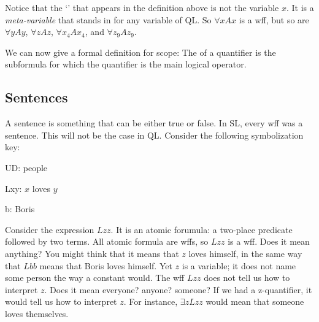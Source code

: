 Notice that the `' that appears in the definition above is not the variable $x$. It is a \emph{meta-variable} that stands in for any variable of QL. So $\forall xAx$ is a wff, but so are $\forall yAy$, $\forall zAz$, $\forall x_4Ax_4$, and $\forall z_9Az_9$.

We can now give a formal definition for scope: The  of a quantifier is the subformula for which the quantifier is the main logical operator. 








\subsection{Sentences}

A {sentence} is something that can be either true or false. In SL, every wff was a sentence. This will not be the case in QL. Consider the following symbolization key:
\begin{ekey}
\item[UD:] people
\item[Lxy:] $x$ loves $y$
\item[b:] Boris
\end{ekey}
Consider the expression $Lzz$. It is an atomic forumula: a two-place predicate followed by two terms. All atomic formula are wffs, so $Lzz$ is a wff. Does it mean anything? You might think that it means that $z$ loves himself, in the same way that $Lbb$ means that Boris loves himself. Yet $z$ is a variable; it does not name some person the way a constant would. The wff $Lzz$ does not tell us how to interpret $z$. Does it mean everyone? anyone? someone? If we had a z-quantifier, it would tell us how to interpret $z$. For instance, $\exists zLzz$ would mean that someone loves themselves.

